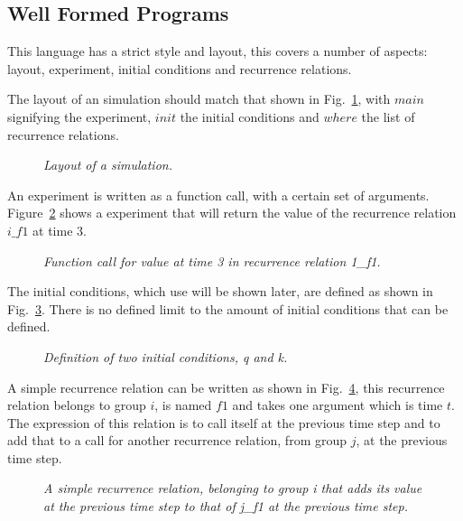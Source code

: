 \documentclass{article}
\begin{document}
\subsection{Well Formed Programs} \label{wellformedprogs}
This language has a strict style and layout, this covers a number of aspects: layout, experiment, initial conditions and recurrence relations.  

The layout of an simulation should match that shown in Fig.~\ref{fig:1exofla}, with $main$ signifying the experiment, $init$ the initial conditions and $where$ the list of recurrence relations. 
\begin{figure}[H]
	\centering
	
	\caption{\it Layout of a simulation.}
	\label{fig:1exofla}
\end{figure} 

An experiment is written as a function call, with a certain set of arguments. Figure~\ref{fig:2exofla} shows a experiment that will return the value of the recurrence relation $i\_f1$ at time $3$.
\begin{figure}[H]
	\centering
	
	\caption{\it Function call for value at time 3 in recurrence relation 1\_f1.}
	\label{fig:2exofla}
\end{figure} 
 
The initial conditions, which use will be shown later, are defined as shown in Fig.~\ref{fig:3exofla}. There is no defined  limit to the amount of initial conditions that can be defined. 
\begin{figure}[H]
	\centering
	
	\caption{\it Definition of two initial conditions, q and k.}
	\label{fig:3exofla}
\end{figure} 
 
A simple recurrence relation can be written as shown in Fig.~\ref{fig:4exofla}, this recurrence relation belongs to group $i$, is named $f1$ and takes one argument which is time $t$. The expression of this relation is to call itself at the previous time step and to add that to a call for another recurrence relation, from group $j$, at the previous time step. 
\begin{figure}[H]
	\centering
	
	\caption{\it A simple recurrence relation, belonging to group i that adds its value at the previous time step to that of j\_f1 at the previous time step.}
	\label{fig:4exofla}
\end{figure} 
 
\end{document}
